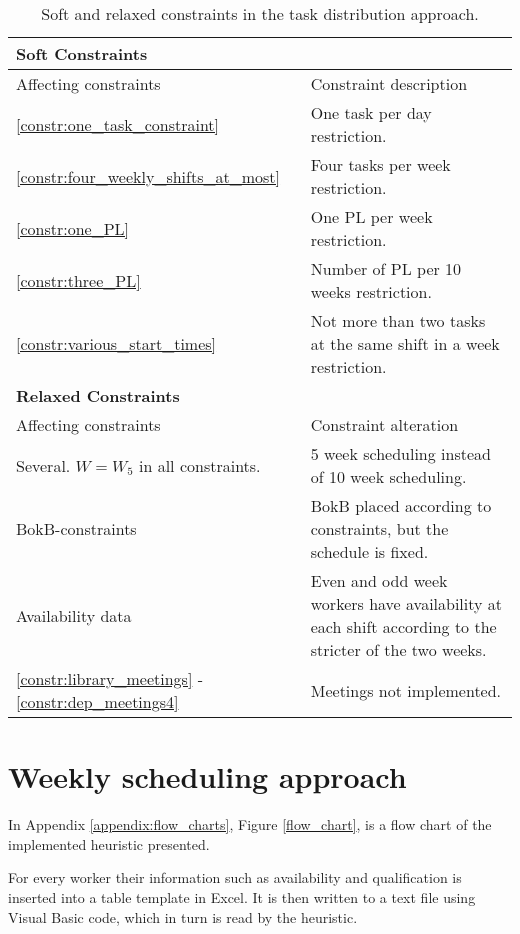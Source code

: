 \begin{table}[!h]
\centering
\caption{Soft and relaxed constraints in the task distribution approach.}
\label{tab:task_constraints}
\begin{tabular}{|p{4cm}|p{7cm}|}
\hline
\multicolumn{2}{|l|}{\cellcolor{corn} \textbf{Soft Constraints}} \\
\hline 
\rowcolor{Gray} Affecting constraints & Constraint description \\ \hline
\ref{constr:one_task_constraint} & One task per day restriction.  \\ \hline
\ref{constr:four_weekly_shifts_at_most} & Four tasks per week restriction. \\ \hline
\ref{constr:one_PL} & One PL per week restriction. \\ \hline
\ref{constr:three_PL} & Number of PL per 10 weeks restriction. \\ \hline
\ref{constr:various_start_times} & Not more than two tasks at the same shift in a week restriction.  \\ \hline
\multicolumn{2}{|l|}{\cellcolor{corn} \textbf{Relaxed Constraints}} \\
\hline 
\rowcolor{Gray} Affecting constraints & Constraint alteration \\ \hline
Several. $W = W_5$ in all constraints. & 5 week scheduling instead of 10 week scheduling. \\ \hline
BokB-constraints & BokB placed according to constraints, but the schedule is fixed. \\ \hline
Availability data & Even and odd week workers have availability at each shift according to the stricter of the two weeks. \\ \hline
\ref{constr:library_meetings} - \ref{constr:dep_meetings4} & Meetings not implemented. \\ \hline
\end{tabular}
\end{table}

\section{Weekly scheduling approach} \label{Weekly}
In Appendix \ref{appendix:flow_charts}, Figure \ref{flow_chart}, is a flow chart of the implemented heuristic presented.

For every worker their information such as availability and qualification is inserted into a table template in Excel. It is then written to a text file using Visual Basic code, which in turn is read by the heuristic.

